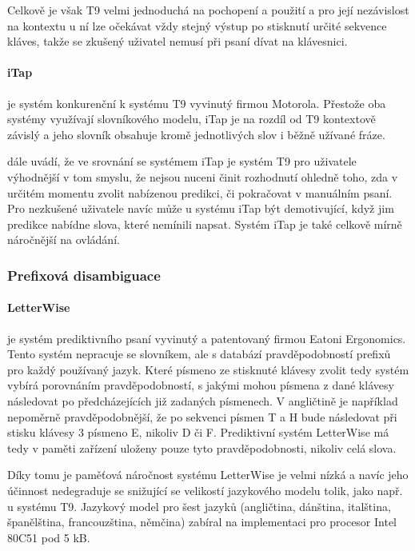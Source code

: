 \documentclass[a4paper,11pt]{article}
\begin{document}
Celkově je však T9 velmi jednoduchá na pochopení a použití a pro její nezávislost na kontextu u ní lze očekávat vždy stejný výstup po stisknutí určité sekvence kláves, takže se zkušený uživatel nemusí při psaní dívat na klávesnici. \parencite{davidmackay}

\paragraph{iTap}
je systém konkurenční k systému T9 vyvinutý firmou Motorola. Přestože oba systémy využívají slovníkového modelu, iTap je na rozdíl od T9 kontextově závislý a jeho slovník obsahuje kromě jednotlivých slov i běžně užívané fráze. 

\parencite{davidmackay} dále uvádí, že ve srovnání se systémem iTap je systém T9 pro uživatele výhodnější v tom smyslu, že nejsou nuceni činit rozhodnutí ohledně toho, zda v určitém momentu zvolit nabízenou predikci, či pokračovat v manuálním psaní. Pro nezkušené uživatele navíc může u systému iTap být demotivující, když jim predikce nabídne slova, které nemínili napsat. Systém iTap je také celkově mírně náročnější na ovládání.

\subsubsection{Prefixová disambiguace}

\paragraph{LetterWise}

je systém prediktivního psaní vyvinutý a patentovaný firmou Eatoni Ergonomics. Tento systém nepracuje se slovníkem, ale s databází pravděpodobností prefixů pro každý používaný jazyk. Které písmeno ze stisknuté klávesy zvolit tedy systém vybírá porovnáním pravděpodobností, s jakými mohou písmena z dané klávesy následovat po předcházejících již zadaných písmenech. V angličtině je například nepoměrně pravděpodobnější, že po sekvenci písmen T a H bude následovat při stisku klávesy 3 písmeno E, nikoliv D či F. Prediktivní systém LetterWise má tedy v paměti zařízení uloženy pouze tyto pravděpodobnosti, nikoliv celá slova. \parencite{MacKenzie2001}

Díky tomu je paměťová náročnost systému LetterWise je velmi nízká a navíc jeho účinnost nedegraduje se snižující se velikostí jazykového modelu tolik, jako např. u systému T9. Jazykový model pro šest jazyků (angličtina, dánština, italština, španělština, francouzština, němčina) zabíral na implementaci pro procesor Intel 80C51 pod 5 kB. \parencite{eatoniletterwisereq} %
\end{document}
